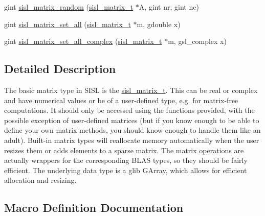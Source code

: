 \begin{DoxyCompactItemize}
\item 
gint \hyperlink{group__matrix_ga19e36308f5f1faa18e4351aa8c8fc8ca}{sisl\+\_\+matrix\+\_\+random} (\hyperlink{group__matrix_gad147923587b355644defb9bfbf981740}{sisl\+\_\+matrix\+\_\+t} $\ast$A, gint nr, gint nc)
\item 
gint \hyperlink{group__matrix_ga66e250169138d9e41edbb5b899476635}{sisl\+\_\+matrix\+\_\+set\+\_\+all} (\hyperlink{group__matrix_gad147923587b355644defb9bfbf981740}{sisl\+\_\+matrix\+\_\+t} $\ast$m, gdouble x)
\item 
gint \hyperlink{group__matrix_ga171958e6d5574ffa91badb5ad38f8d4f}{sisl\+\_\+matrix\+\_\+set\+\_\+all\+\_\+complex} (\hyperlink{group__matrix_gad147923587b355644defb9bfbf981740}{sisl\+\_\+matrix\+\_\+t} $\ast$m, gsl\+\_\+complex x)
\end{DoxyCompactItemize}


\subsection{Detailed Description}
The basic matrix type in S\+I\+S\+L is the \hyperlink{group__matrix_gad147923587b355644defb9bfbf981740}{sisl\+\_\+matrix\+\_\+t}. This can be real or complex and have numerical values or be of a user-\/defined type, e.\+g. for matrix-\/free computations. It should only be accessed using the functions provided, with the possible exception of user-\/defined matrices (but if you know enough to be able to define your own matrix methods, you should know enough to handle them like an adult). Built-\/in matrix types will reallocate memory automatically when the user resizes them or adds elements to a sparse matrix. The matrix operations are actually wrappers for the corresponding B\+L\+A\+S types, so they should be fairly efficient. The underlying data type is a glib G\+Array, which allows for efficient allocation and resizing. 

\subsection{Macro Definition Documentation}
\hypertarget{group__matrix_ga352f97fb2d44b57e23e129d860458eeb}{}

